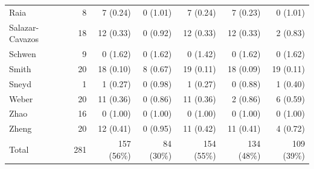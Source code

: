 \begin{longtable}{@{}lrrrrrr@{}}
Raia & 8 & 7 (0.24) & 0 (1.01) & 7 (0.24) & 7 (0.23) & 0 (1.01) \\
Salazar-Cavazos & 18 & 12 (0.33) & 0 (0.92) & 12 (0.33) & 12 (0.33) & 2 (0.83) \\
Schwen & 9 & 0 (1.62) & 0 (1.62) & 0 (1.42) & 0 (1.62) & 0 (1.62) \\
Smith & 20 & 18 (0.10) & 8 (0.67) & 19 (0.11) & 18 (0.09) & 19 (0.11) \\
Sneyd & 1 & 1 (0.27) & 0 (0.98) & 1 (0.27) & 0 (0.88) & 1 (0.40) \\
Weber & 20 & 11 (0.36) & 0 (0.86) & 11 (0.36) & 2 (0.86) & 6 (0.59) \\
Zhao & 16 & 0 (1.00) & 0 (1.00) & 0 (1.00) & 0 (1.00) & 0 (1.00) \\
Zheng & 20 & 12 (0.41) & 0 (0.95) & 11 (0.42) & 11 (0.41) & 4 (0.72) \\
\midrule Total & 281 & 157 (56\%) & 84 (30\%) & 154 (55\%) & 134 (48\%) & 109 (39\%) \\
\bottomrule
\end{longtable}
